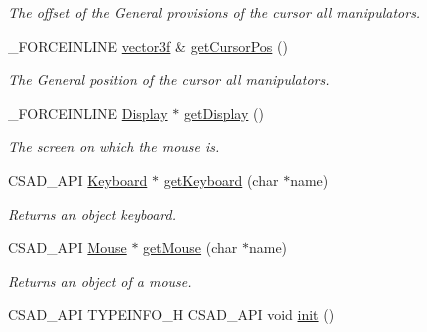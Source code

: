 \begin{DoxyCompactItemize}
\begin{DoxyCompactList}\small\item\em The offset of the General provisions of the cursor all manipulators. \end{DoxyCompactList}\item 
\hypertarget{classcsad_1_1_input_a1afaf2cf308eb0da1c7ca06b713d375b}{\-\_\-\-F\-O\-R\-C\-E\-I\-N\-L\-I\-N\-E \hyperlink{classbt_1_1vector3f}{vector3f} \& \hyperlink{classcsad_1_1_input_a1afaf2cf308eb0da1c7ca06b713d375b}{get\-Cursor\-Pos} ()}\label{classcsad_1_1_input_a1afaf2cf308eb0da1c7ca06b713d375b}

\begin{DoxyCompactList}\small\item\em The General position of the cursor all manipulators. \end{DoxyCompactList}\item 
\hypertarget{classcsad_1_1_input_a0acafcd1d8b3ed76d8abbfbfc12de84d}{\-\_\-\-F\-O\-R\-C\-E\-I\-N\-L\-I\-N\-E \hyperlink{classcsad_1_1_display}{Display} $\ast$ \hyperlink{classcsad_1_1_input_a0acafcd1d8b3ed76d8abbfbfc12de84d}{get\-Display} ()}\label{classcsad_1_1_input_a0acafcd1d8b3ed76d8abbfbfc12de84d}

\begin{DoxyCompactList}\small\item\em The screen on which the mouse is. \end{DoxyCompactList}\item 
\hypertarget{classcsad_1_1_input_a24d54b9c326d129e45c780e1b52b6205}{C\-S\-A\-D\-\_\-\-A\-P\-I \hyperlink{classcsad_1_1_keyboard}{Keyboard} $\ast$ \hyperlink{classcsad_1_1_input_a24d54b9c326d129e45c780e1b52b6205}{get\-Keyboard} (char $\ast$name)}\label{classcsad_1_1_input_a24d54b9c326d129e45c780e1b52b6205}

\begin{DoxyCompactList}\small\item\em Returns an object keyboard. \end{DoxyCompactList}\item 
\hypertarget{classcsad_1_1_input_a0d7ef03bb02cb17f0bf0f745f9e367bc}{C\-S\-A\-D\-\_\-\-A\-P\-I \hyperlink{classcsad_1_1_mouse}{Mouse} $\ast$ \hyperlink{classcsad_1_1_input_a0d7ef03bb02cb17f0bf0f745f9e367bc}{get\-Mouse} (char $\ast$name)}\label{classcsad_1_1_input_a0d7ef03bb02cb17f0bf0f745f9e367bc}

\begin{DoxyCompactList}\small\item\em Returns an object of a mouse. \end{DoxyCompactList}\item 
\hypertarget{classcsad_1_1_input_a41d9e739c64e71760fc3bf079ca752c7}{C\-S\-A\-D\-\_\-\-A\-P\-I T\-Y\-P\-E\-I\-N\-F\-O\-\_\-\-H C\-S\-A\-D\-\_\-\-A\-P\-I void \hyperlink{classcsad_1_1_input_a41d9e739c64e71760fc3bf079ca752c7}{init} ()}\label{classcsad_1_1_input_a41d9e739c64e71760fc3bf079ca752c7}


\end{DoxyCompactItemize}

